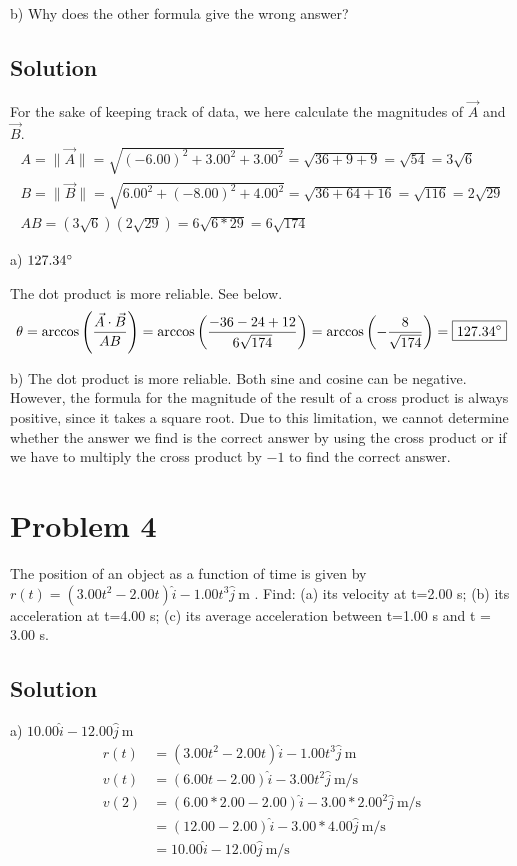 \documentclass[12pt]{article}
\begin{document}
b) Why does the other formula give the wrong answer?

\subsection*{Solution}
For the sake of keeping track of data, we here calculate the magnitudes of $\vec{A}$ and $\vec{B}$.
\begin{eqnarray*}
    A = \lVert\vec{A}\rVert = \sqrt{(-6.00)^2 + 3.00^2 + 3.00^2} = \sqrt{36 + 9 + 9} = \sqrt{54} = 3\sqrt{6}\\
    B = \lVert\vec{B}\rVert = \sqrt{6.00^2 + (-8.00)^2 + 4.00^2} = \sqrt{36 + 64 + 16} = \sqrt{116} = 2\sqrt{29}\\
    AB = (3\sqrt{6})(2\sqrt{29}) = 6\sqrt{6*29} = 6\sqrt{174}
\end{eqnarray*}

a) $127.34\degree$

The dot product is more reliable. See below.
\begin{eqnarray*}
    \theta = \arccos\left(\frac{\vec{A}\cdot\vec{B}}{AB}\right) = \arccos\left(\frac{-36 - 24 + 12}{6\sqrt{174}}\right) = \arccos\left(-\frac{8}{\sqrt{174}}\right) = \boxed{127.34\degree}
\end{eqnarray*}

b) The dot product is more reliable. Both sine and cosine can be negative. However, the formula for the magnitude of the result of a cross product is always positive, since it takes a square root. Due to this limitation, we cannot determine whether the answer we find is the correct answer by using the cross product or if we have to multiply the cross product by $-1$ to find the correct answer. 

\pagebreak
\section*{Problem 4}
The position of an object as a function of time is given by $r(t) = (3.00 t^2 - 2.00 t) \hat{i} - 1.00 t^3 \hat{j}\ \unit{\m}$ . Find: (a) its velocity at t=2.00 s; (b) its acceleration at t=4.00 s; (c) its average acceleration between t=1.00 s and t = 3.00 s.

\subsection*{Solution}
a) $ 10.00 \hat{i} - 12.00 \hat{j}\ \unit{\m} $
\begin{align*}
    r(t) &= (3.00 t^2 - 2.00 t) \hat{i} - 1.00 t^3 \hat{j}\ \unit{\m}\\
    v(t) &= (6.00 t - 2.00) \hat{i} - 3.00 t^2 \hat{j}\ \unit{\m/\s}\\
    v(2) &= (6.00 * 2.00 - 2.00) \hat{i} - 3.00 * 2.00^2 \hat{j}\ \unit{\m/\s}\\
        &= (12.00 - 2.00) \hat{i} - 3.00 * 4.00 \hat{j}\ \unit{\m/\s}\\
        &= \boxed{10.00 \hat{i} - 12.00 \hat{j}\ \unit{\m/\s}}
\end{align*}
\end{document}
